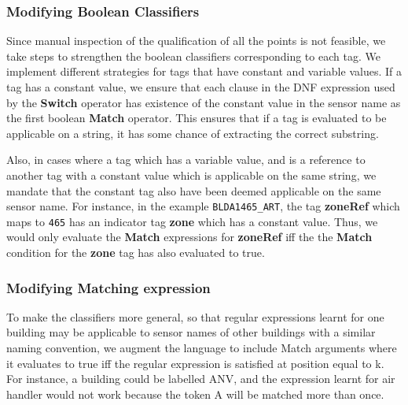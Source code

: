 \subsubsection{Modifying Boolean Classifiers}

Since manual inspection of the qualification of all the points is not feasible, we take steps to strengthen the boolean classifiers corresponding to each tag. We implement different strategies for tags that have constant and variable values. If a tag has a constant value, we ensure that each clause in the DNF expression used by the {\bf Switch} operator has existence of the constant value in the sensor name as the first boolean {\bf Match} operator. This ensures that if a tag is evaluated to be applicable on a string, it has some chance of extracting the correct substring. 

Also, in cases where a tag which has a variable value, and is a reference to another tag with a constant value which is applicable on the same string, we mandate that the constant tag also have been deemed applicable on the same sensor name. For instance, in the example \texttt{BLDA1465\_ART}, the tag {\bf zoneRef} which maps to \texttt{465} has an indicator tag {\bf zone} which has a constant value. Thus, we would only evaluate the {\bf Match} expressions for {\bf zoneRef} iff the the {\bf Match} condition for the {\bf zone} tag has also evaluated to true. 




\subsubsection{Modifying Matching expression}
To make the classifiers more general, so that regular expressions learnt for one building may be applicable to sensor names of other buildings with a similar naming convention, we augment the language to include Match arguments where it evaluates to true iff the regular expression is satisfied at position equal to k. For instance, a building could be labelled ANV, and the expression learnt for air handler would not work because the token A will be matched more than once. 





%

